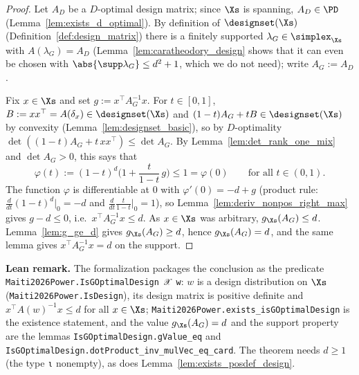 \begin{proof}
\leanok
{}
Let $A_D$ be a $D$-optimal design matrix; since $\Xs$ is spanning, $A_D \in \PD$
(Lemma~\ref{lem:exists_d_optimal}). By definition of $\designset(\Xs)$
(Definition~\ref{def:design_matrix}) there is a finitely supported $\lambda_G \in \simplex_{\Xs}$
with $A(\lambda_G) = A_D$ (Lemma~\ref{lem:caratheodory_design} shows that it can even be chosen
with $\abs{\supp\lambda_G} \le d^2+1$, which we do not need); write $A_G := A_D$.

Fix $x \in \Xs$ and set $g := x^\top A_G^{-1}x$. For $t \in [0,1]$, $B := xx^\top = A(\delta_x)
\in \designset(\Xs)$ and $(1-t)A_G + tB \in \designset(\Xs)$ by convexity
(Lemma~\ref{lem:designset_basic}), so by $D$-optimality $\det((1-t)A_G + t\,xx^\top) \le \det A_G$.
By Lemma~\ref{lem:det_rank_one_mix} and $\det A_G > 0$, this says that
\[
  \varphi(t) := (1-t)^d\Big(1 + \frac{t}{1-t}\,g\Big) \le 1 = \varphi(0)
  \qquad\text{for all } t \in (0,1) .
\]
The function $\varphi$ is differentiable at $0$ with $\varphi'(0) = -d + g$ (product rule:
$\frac{d}{dt}(1-t)^d|_{0} = -d$ and $\frac{d}{dt}\frac{t}{1-t}|_0 = 1$), so
Lemma~\ref{lem:deriv_nonpos_right_max} gives $g - d \le 0$, i.e.\ $x^\top A_G^{-1}x \le d$.
As $x \in \Xs$ was arbitrary, $g_{\Xs}(A_G) \le d$. Lemma~\ref{lem:g_ge_d} gives
$g_{\Xs}(A_G) \ge d$, hence $g_{\Xs}(A_G) = d$, and the same lemma gives
$x^\top A_G^{-1}x = d$ on the support.
\end{proof}

\textbf{Lean remark.} The formalization packages the conclusion as the predicate
\texttt{Maiti2026Power.IsGOptimalDesign 𝒳 w}: $w$ is a design distribution on $\Xs$
(\texttt{Maiti2026Power.IsDesign}), its design matrix is positive definite and
$x^\top A(w)^{-1}x \le d$ for all $x \in \Xs$; \texttt{Maiti2026Power.exists\_isGOptimalDesign} is the
existence statement, and the value $g_{\Xs}(A_G) = d$ and the support property are the lemmas
\texttt{IsGOptimalDesign.gValue\_eq} and \texttt{IsGOptimalDesign.dotProduct\_inv\_mulVec\_eq\_card}.
The theorem needs $d \ge 1$ (the type \texttt{ι} nonempty), as does
Lemma~\ref{lem:exists_posdef_design}.

